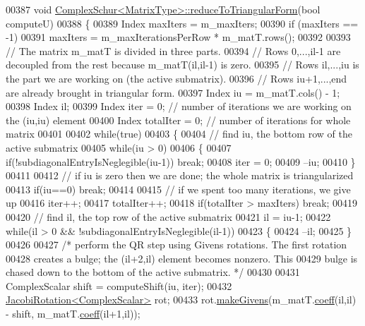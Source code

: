 \begin{DoxyCode}
00387 \textcolor{keywordtype}{void} \hyperlink{group___eigenvalues___module_class_eigen_1_1_complex_schur}{ComplexSchur<MatrixType>::reduceToTriangularForm}(\textcolor{keywordtype}{bool} 
      computeU)
00388 \{  
00389   Index maxIters = m\_maxIters;
00390   \textcolor{keywordflow}{if} (maxIters == -1)
00391     maxIters = m\_maxIterationsPerRow * m\_matT.rows();
00392 
00393   \textcolor{comment}{// The matrix m\_matT is divided in three parts. }
00394   \textcolor{comment}{// Rows 0,...,il-1 are decoupled from the rest because m\_matT(il,il-1) is zero. }
00395   \textcolor{comment}{// Rows il,...,iu is the part we are working on (the active submatrix).}
00396   \textcolor{comment}{// Rows iu+1,...,end are already brought in triangular form.}
00397   Index iu = m\_matT.cols() - 1;
00398   Index il;
00399   Index iter = 0; \textcolor{comment}{// number of iterations we are working on the (iu,iu) element}
00400   Index totalIter = 0; \textcolor{comment}{// number of iterations for whole matrix}
00401 
00402   \textcolor{keywordflow}{while}(\textcolor{keyword}{true})
00403   \{
00404     \textcolor{comment}{// find iu, the bottom row of the active submatrix}
00405     \textcolor{keywordflow}{while}(iu > 0)
00406     \{
00407       \textcolor{keywordflow}{if}(!subdiagonalEntryIsNeglegible(iu-1)) \textcolor{keywordflow}{break};
00408       iter = 0;
00409       --iu;
00410     \}
00411 
00412     \textcolor{comment}{// if iu is zero then we are done; the whole matrix is triangularized}
00413     \textcolor{keywordflow}{if}(iu==0) \textcolor{keywordflow}{break};
00414 
00415     \textcolor{comment}{// if we spent too many iterations, we give up}
00416     iter++;
00417     totalIter++;
00418     \textcolor{keywordflow}{if}(totalIter > maxIters) \textcolor{keywordflow}{break};
00419 
00420     \textcolor{comment}{// find il, the top row of the active submatrix}
00421     il = iu-1;
00422     \textcolor{keywordflow}{while}(il > 0 && !subdiagonalEntryIsNeglegible(il-1))
00423     \{
00424       --il;
00425     \}
00426 
00427     \textcolor{comment}{/* perform the QR step using Givens rotations. The first rotation}
00428 \textcolor{comment}{       creates a bulge; the (il+2,il) element becomes nonzero. This}
00429 \textcolor{comment}{       bulge is chased down to the bottom of the active submatrix. */}
00430 
00431     ComplexScalar shift = computeShift(iu, iter);
00432     \hyperlink{group___jacobi___module_class_eigen_1_1_jacobi_rotation}{JacobiRotation<ComplexScalar>} rot;
00433     rot.\hyperlink{group___jacobi___module_af73c81e9cc139b7e0d877ce553b02ec0}{makeGivens}(m\_matT.\hyperlink{class_eigen_1_1_plain_object_base_afbfc12954f16d21aedb7bd839f64a278}{coeff}(il,il) - shift, m\_matT.\hyperlink{class_eigen_1_1_plain_object_base_afbfc12954f16d21aedb7bd839f64a278}{coeff}(il+1,il));

\end{DoxyCode}
